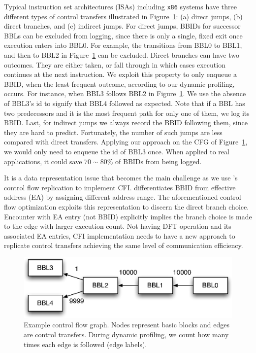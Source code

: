 Typical instruction set architectures (ISAs) including {\tt x86} systems have
three different types of control transfers illustrated in
Figure~\ref{fig:cfg0}: (a) direct jumps, (b) direct branches, and (c) indirect
jumps. For direct jumps, BBIDs for successor BBLs can be excluded from logging,
since there is only a single, fixed exit once execution enters into BBL0. For
example, the transitions from BBL0 to BBL1, and then to BBL2 in
Figure~\ref{fig:cfg0} can be excluded. Direct branches can have two outcomes.
They are either taken, or fall through in which cases execution continues at the next
instruction. We exploit this property to only enqueue a BBID, when the least
frequent outcome, according to our dynamic profiling, occurs. For instance,
when BBL3 follows BBL2 in Figure~\ref{fig:cfg0}. We use the absence of BBL3’s
id to signify that BBL4 followed as expected. Note that if a BBL has two
predecessors and it is the most frequent path for only one of them, we log its
BBID. Last, for indirect jumps we always record the BBID following them, since
they are hard to predict.  Fortunately, the number of such jumps are less
compared with direct transfers.
%
Applying our approach on the CFG of Figure~\ref{fig:cfg0}, we would
only need to enqueue the id of BBL3 once. When applied to real
applications, it could save $70 \sim 80 \%$ of BBIDs from being logged.

It is a data representation issue that becomes the main challenge as we use
\sreplica's control flow replication to implement CFI. \sreplica differentiates
BBID from effective address (EA) by assigning different address range.
The aforementioned control flow optimization exploits this representation to
discern the direct branch choice. Encounter with EA entry (not BBID) explicitly
implies the branch choice is made to the edge with larger execution count.
%
Not having DFT operation and its associated EA entries, CFI implementation
needs to have a new approach to replicate control transfers achieving the same
level of communication efficiency.

\begin{figure}[tb]
    \centering
    \includegraphics[width=0.64\linewidth]{figs/cfg0.eps}
    \caption{Example control flow graph. Nodes represent basic blocks and edges
    are control transfers. During dynamic profiling, we count how many times
    each edge is followed (edge labels). \label{fig:cfg0}}
\end{figure}


